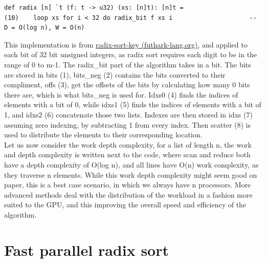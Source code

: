 \documentclass{article}
\begin{document}
\begin{itemize}
\begin{lstlisting}
def radix [n] `t (f: t -> u32) (xs: [n]t): [n]t = 
(10)    loop xs for i < 32 do radix_bit f xs i                     -- D = O(log n), W = O(n)
\end{lstlisting}

This implementation is from \href{https://futhark-lang.org/examples/radix-sort-key.html}{radix-sort-key (futhark-lang.org)}, and applied to each bit of 32 bit unsigned integers, as radix sort requires each digit to be in the range of 0 to m-1. The radix\_bit part of the algorithm takes in a bit. The bits are stored in bits (1), bits\_neg (2) contains the bits converted to their compliment, offs (3), get the offsets of the bits by calculating how many 0 bits there are, which is what bits\_neg is used for. Idxs0 (4) finds the indices of elements with a bit of 0, while idxs1 (5) finds the indices of elements with a bit of 1, and idxs2 (6) concatenate those two lists. Indexes are then stored in idxs (7) assuming zero indexing, by subtracting 1 from every index. Then scatter (8) is used to distribute the elements to their corresponding location.
\\
Let us now consider the work depth complexity, for a list of length n, the work and depth complexity is written next to the code, where scan and reduce both have a depth complexity of O(log n), and all lines have O(n) work complexity, as they traverse n elements. While this work depth complexity might seem good on paper, this is a best case scenario, in which we always have n processors. More advanced methods deal with the distribution of the workload in a fashion more suited to the GPU, and this improving the overall speed and efficiency of the algorithm. 
\end{itemize}

\section{Fast parallel radix sort}
\end{document}
